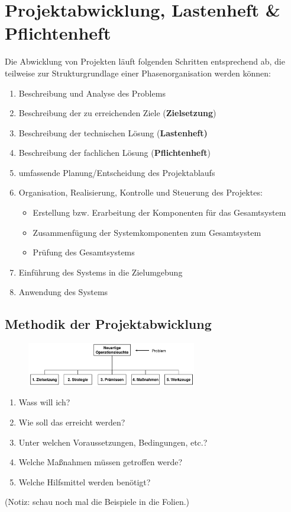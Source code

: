 \documentclass[11pt,a4paper]{article}
\begin{document}
\section{Projektabwicklung, Lastenheft \& Pflichtenheft}

Die Abwicklung von Projekten läuft folgenden Schritten entsprechend ab,
die teilweise zur Strukturgrundlage einer Phasenorganisation werden können:

\begin{enumerate}
\item Beschreibung und Analyse des Problems
\item Beschreibung der zu erreichenden Ziele (\textbf{Zielsetzung})
\item Beschreibung der technischen Lösung (\textbf{Lastenheft)}
\item Beschreibung der fachlichen Lösung (\textbf{Pflichtenheft})
\item umfassende Planung/Entscheidung des Projektablaufs
\item Organisation, Realisierung, Kontrolle und Steuerung des Projektes:
	\begin{itemize}
	\item Erstellung bzw. Erarbeitung der Komponenten für das Gesamtsystem
	\item Zusammenfügung der Systemkomponenten zum Gesamtsystem
	\item Prüfung des Gesamtsystems
	\end{itemize}
\item Einführung des Systems in die Zielumgebung
\item Anwendung des Systems
\end{enumerate}

\subsection{Methodik der Projektabwicklung}
\begin{figure}[H]
	\centering

	\includegraphics[width=0.66\textwidth]{ch6/methodik}

\end{figure}

\begin{enumerate}
\item Wass will ich?
\item Wie soll das erreicht werden?
\item Unter welchen Voraussetzungen, Bedingungen, etc.?
\item Welche Maßnahmen müssen getroffen werde?
\item Welche Hilfsmittel werden benötigt?
\end{enumerate}	
\noindent
(Notiz: schau noch mal die Beispiele in die Folien.)
\pagebreak
\end{document}
